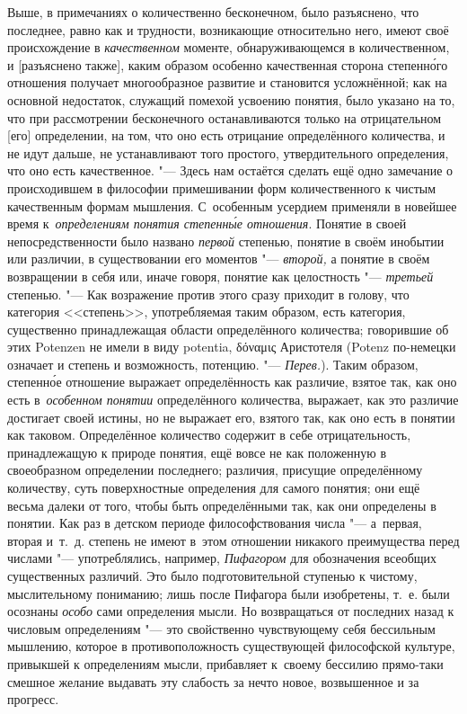 Выше, в примечаниях о количественно бесконечном, было разъяснено, что
последнее, равно как и трудности, возникающие относительно него, имеют своё
происхождение в {\em качественном} моменте, обнаруживающемся в количественном,
и [разъяснено также], каким образом особенно качественная сторона
степенн\'{о}го отношения получает многообразное развитие и становится
усложнённой; как на основной недостаток, служащий
помехой усвоению понятия, было указано на то, что при рассмотрении бесконечного
останавливаются только на отрицательном [его] определении, на том, что оно есть
отрицание определённого количества, и не идут дальше, не устанавливают того
простого, утвердительного определения, что оно есть качественное. "--- Здесь
нам остаётся сделать ещё одно замечание о происходившем в философии
примешивании форм количественного к чистым качественным формам мышления.
С~особенным усердием применяли в новейшее время
к~{\em определениям понятия степенн\'{ы}е отношения}. Понятие в своей непосредственности было названо
{\em первой} степенью, понятие в своём инобытии или различии, в существовании
его моментов "--- {\em второй,} а понятие в своём возвращении в себя или, иначе
говоря, понятие как целостность "--- {\em третьей} степенью. "--- Как
возражение против этого сразу приходит в голову, что категория <<степень>>,
употребляемая таким образом, есть категория, существенно принадлежащая области
определённого количества; говорившие об этих Potenzen не имели в виду potentia,
\textgreek{δόναμις} Аристотеля (Potenz по-немецки означает и степень и
возможность, потенцию. "--- {\em Перев.}). Таким образом, степенн\'{о}е
отношение выражает определённость как различие, взятое так, как оно есть
в~{\em особенном понятии} определённого количества, выражает, как это различие
достигает своей истины, но не выражает его, взятого так, как оно есть в понятии
как таковом. Определённое количество содержит в себе отрицательность,
принадлежащую к природе понятия, ещё вовсе не как положенную в своеобразном
определении последнего; различия, присущие определённому количеству, суть
поверхностные определения для самого понятия; они ещё весьма далеки от того,
чтобы быть определёнными так, как они определены в понятии. Как раз в детском
периоде философствования числа "--- а~первая, вторая и~т.~д. степень не имеют
в~этом отношении никакого преимущества перед числами "--- употреблялись,
например, {\em Пифагором} для обозначения всеобщих существенных различий. Это
было подготовительной ступенью к чистому, мыслительному пониманию; лишь после
Пифагора были изобретены, т.~е. были осознаны {\em особо} сами определения
мысли. Но возвращаться от последних назад к числовым определениям "--- это
свойственно чувствующему себя бессильным мышлению, которое в противоположность
существующей философской культуре, привыкшей к определениям мысли, прибавляет
к~своему бессилию прямо-таки смешное желание выдавать эту слабость за нечто
новое, возвышенное и за прогресс.

